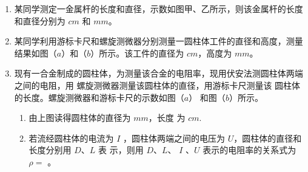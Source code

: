\begin{enumerate}
\banswer{

}

\item 
{}
某同学测定一金属杆的长度和直径，示数如图甲、乙所示，则该金属杆的长度和直径分别为
$ cm $ 和
$ mm $。
\begin{figure}[h!]
\centering

\end{figure}


\banswer{

}

\item 
{}
某同学利用游标卡尺和螺旋测微器分别测量一圆柱体工件的直径和高度，测量
结果如图（$ a $）和（$ b $）所示。该工件的直径为  $ cm $，高度为  $ mm $。
\begin{figure}[h!]
\centering

\end{figure}

\banswer{

}



\newpage
\item 
{}
现有一合金制成的圆柱体，为测量该合金的电阻率，现用伏安法测圆柱体两端之间的电阻，用
螺旋测微器测量该圆柱体的直径，用游标卡尺测量该
圆柱体的长度。螺旋测微器和游标卡尺的示数如图（$ a $）
和图（$ b $）所示。
\begin{figure}[h!]
\centering

\end{figure}

\begin{enumerate}
\renewcommand{\labelenumi}{\arabic{enumi}.}
\item
由上图读得圆柱体的直径为
$ mm $，长度
为
$ cm $.


\item 
若流经圆柱体的电流为 $ I $ ，圆柱体两端之间的电压为 $ U $，圆柱体的直径和长度分别用 $ D $、$ L $ 表
示，则用 $ D $、$ L $、 $ I $ 、$ U $ 表示的电阻率的关系式为$ \rho = $  。

\end{enumerate}







\end{enumerate}

